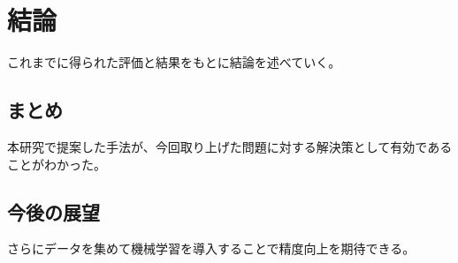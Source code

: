 \chapter{結論}
\label{chap:conclusion}

これまでに得られた評価と結果をもとに結論を述べていく。

\section{まとめ}
\label{section:conclusion_sum}

本研究で提案した手法が、今回取り上げた問題に対する解決策として有効であることがわかった。

\section{今後の展望}

さらにデータを集めて機械学習を導入することで精度向上を期待できる。
